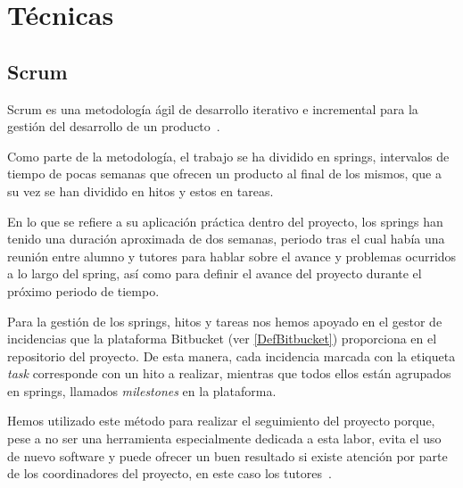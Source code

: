 

\section{Técnicas}
\subsection{Scrum}

Scrum es una metodología ágil de desarrollo iterativo e incremental para la gestión del desarrollo de un producto~\cite{wikiScrum}. 

Como parte de la metodología, el trabajo se ha dividido en springs, intervalos de tiempo de pocas semanas que ofrecen un producto al final de los mismos, que a su vez se han dividido en hitos y estos en tareas.

En lo que se refiere a su aplicación práctica dentro del proyecto, los springs han tenido una duración aproximada de dos semanas, periodo tras el cual había una reunión entre alumno y tutores para hablar sobre el avance y problemas ocurridos a lo largo del spring, así como para definir el avance del proyecto durante el próximo periodo de tiempo.

Para la gestión de los springs, hitos y tareas nos hemos apoyado en el gestor de incidencias que la plataforma Bitbucket (ver \ref{DefBitbucket}) proporciona en el repositorio del proyecto. De esta manera, cada incidencia marcada con la etiqueta \textit{task} corresponde con un hito a realizar, mientras que todos ellos están agrupados en springs, llamados \textit{milestones} en la plataforma.

Hemos utilizado este método para realizar el seguimiento del proyecto porque, pese a no ser una herramienta especialmente dedicada a esta labor, evita el uso de nuevo software y puede ofrecer un buen resultado si existe atención por parte de los coordinadores del proyecto, en este caso los tutores~\cite{WhyIssues}.



